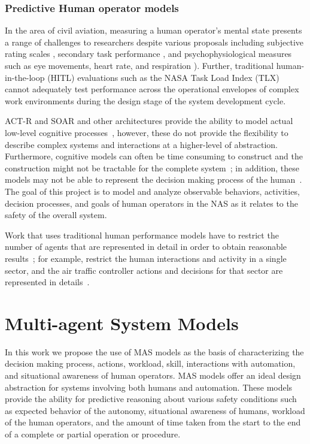 \documentclass[12pt]{article}
\begin{document}
\subsubsection{Predictive Human operator models} 

In the area of civil aviation, measuring a human operator's mental
state presents a range of challenges to researchers despite various
proposals including subjective rating scales \cite{NASATLX88},
secondary task performance \cite{DualTaskMethodology91}, and
psychophysiological measures such as eye movements, heart rate, and
respiration \cite{MetricsWorkloadKramer91}).  Further, traditional
hu\-man\--in\--the\--lo\-op (HI\-TL) evaluations such as the NASA Task
Load Index (TLX) cannot adequately test performance across the
operational envelopes of complex work environments during the design
stage of the system development cycle.

ACT-R and SOAR and other
architectures provide the ability to model actual low-level cognitive
processes~\cite{anderson1997act,laird1987soar,lebiere2013cognitive,liu2009qn,lundinsimulating},
however, these do not provide the flexibility to describe complex
systems and interactions at a higher-level of abstraction.
Furthermore, cognitive models can often be time consuming to construct
and the construction might not be tractable for the complete
system~\cite{lebiere2013cognitive}; in addition, these models may not
be able to represent the decision making process of the
human~\cite{pritchett2011simulating}. The goal of this project is to
model and analyze observable behaviors, activities, decision
processes, and goals of human operators in the NAS as it relates to
the safety of the overall system.

Work that uses traditional human performance models have to restrict the number of agents that are represented in detail in order to obtain reasonable results~\cite{MIDAS}; for example, restrict the human interactions and activity in a single sector, and the air traffic controller actions and decisions for that sector are represented in details~\cite{MIDAS}. 


\section{Multi-agent System Models}

In this work we propose the use of MAS models as the basis of
characterizing the decision making process, actions, workload, skill,
interactions with automation, and situational awareness of human
operators.  MAS models offer an ideal design abstraction for systems
involving both humans and automation. These models provide the ability
for predictive reasoning about various safety conditions such as
expected behavior of the autonomy, situational awareness of humans,
workload of the human operators, and the amount of time taken from the
start to the end of a complete or partial operation or procedure.
\end{document}
